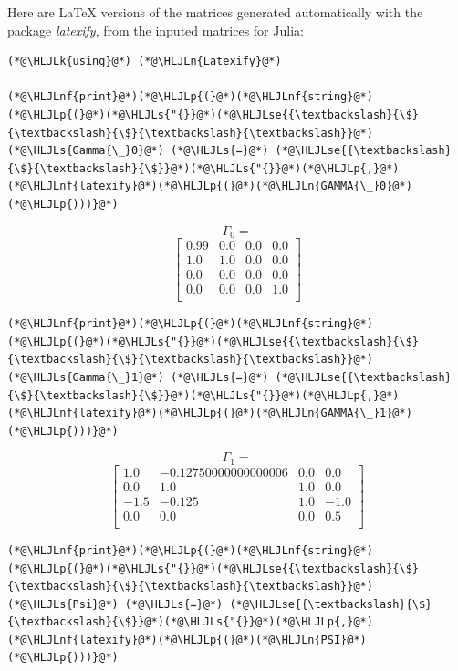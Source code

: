 \documentclass[12pt,a4paper]{article}
\newcommand{\HLJLk}[1]{\textcolor[RGB]{148,91,176}{\textbf{#1}}}
\newcommand{\HLJLn}[1]{#1}
\newcommand{\HLJLnf}[1]{\textcolor[RGB]{66,102,213}{#1}}
\newcommand{\HLJLs}[1]{\textcolor[RGB]{201,61,57}{#1}}
\newcommand{\HLJLse}[1]{\textcolor[RGB]{59,151,46}{#1}}
\newcommand{\HLJLp}[1]{#1}
\begin{document}
Here are LaTeX versions of the matrices generated automatically with the package \emph{latexify}, from the inputed matrices for Julia:


\begin{lstlisting}
(*@\HLJLk{using}@*) (*@\HLJLn{Latexify}@*)

(*@\HLJLnf{print}@*)(*@\HLJLp{(}@*)(*@\HLJLnf{string}@*)(*@\HLJLp{(}@*)(*@\HLJLs{"{}}@*)(*@\HLJLse{{\textbackslash}{\$}{\textbackslash}{\$}{\textbackslash}{\textbackslash}}@*)(*@\HLJLs{Gamma{\_}0}@*) (*@\HLJLs{=}@*) (*@\HLJLse{{\textbackslash}{\$}{\textbackslash}{\$}}@*)(*@\HLJLs{"{}}@*)(*@\HLJLp{,}@*)(*@\HLJLnf{latexify}@*)(*@\HLJLp{(}@*)(*@\HLJLn{GAMMA{\_}0}@*)(*@\HLJLp{)))}@*)
\end{lstlisting}

$$\Gamma_0 = $$\begin{equation}
\left[
\begin{array}{cccc}
0.99 & 0.0 & 0.0 & 0.0 \\
1.0 & 1.0 & 0.0 & 0.0 \\
0.0 & 0.0 & 0.0 & 0.0 \\
0.0 & 0.0 & 0.0 & 1.0 \\
\end{array}
\right]
\end{equation}


\begin{lstlisting}
(*@\HLJLnf{print}@*)(*@\HLJLp{(}@*)(*@\HLJLnf{string}@*)(*@\HLJLp{(}@*)(*@\HLJLs{"{}}@*)(*@\HLJLse{{\textbackslash}{\$}{\textbackslash}{\$}{\textbackslash}{\textbackslash}}@*)(*@\HLJLs{Gamma{\_}1}@*) (*@\HLJLs{=}@*) (*@\HLJLse{{\textbackslash}{\$}{\textbackslash}{\$}}@*)(*@\HLJLs{"{}}@*)(*@\HLJLp{,}@*)(*@\HLJLnf{latexify}@*)(*@\HLJLp{(}@*)(*@\HLJLn{GAMMA{\_}1}@*)(*@\HLJLp{)))}@*)
\end{lstlisting}

$$\Gamma_1 = $$\begin{equation}
\left[
\begin{array}{cccc}
1.0 & -0.12750000000000006 & 0.0 & 0.0 \\
0.0 & 1.0 & 1.0 & 0.0 \\
-1.5 & -0.125 & 1.0 & -1.0 \\
0.0 & 0.0 & 0.0 & 0.5 \\
\end{array}
\right]
\end{equation}


\begin{lstlisting}
(*@\HLJLnf{print}@*)(*@\HLJLp{(}@*)(*@\HLJLnf{string}@*)(*@\HLJLp{(}@*)(*@\HLJLs{"{}}@*)(*@\HLJLse{{\textbackslash}{\$}{\textbackslash}{\$}{\textbackslash}{\textbackslash}}@*)(*@\HLJLs{Psi}@*) (*@\HLJLs{=}@*) (*@\HLJLse{{\textbackslash}{\$}{\textbackslash}{\$}}@*)(*@\HLJLs{"{}}@*)(*@\HLJLp{,}@*)(*@\HLJLnf{latexify}@*)(*@\HLJLp{(}@*)(*@\HLJLn{PSI}@*)(*@\HLJLp{)))}@*)
\end{lstlisting}
\end{document}
